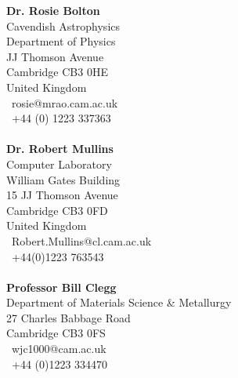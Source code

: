 \documentclass[11pt]{article}
\begin{document}
\noindent\textbf{Dr. Rosie Bolton}\\
Cavendish Astrophysics\\
Department of Physics\\
JJ Thomson Avenue\\
Cambridge CB3 0HE\\
United Kingdom\\
\Letter\ rosie@mrao.cam.ac.uk\\
\Telefon\ +44 (0) 1223 337363\\\\
\textbf{Dr. Robert Mullins}\\
Computer Laboratory\\
William Gates Building\\
15 JJ Thomson Avenue\\
Cambridge CB3 0FD\\
United Kingdom\\
\Letter\ Robert.Mullins@cl.cam.ac.uk\\
\Telefon\ +44(0)1223 763543\\\\
\textbf{Professor Bill Clegg}\\
Department of Materials Science \& Metallurgy\\
27 Charles Babbage Road\\
Cambridge CB3 0FS\\
\Letter\ wjc1000@cam.ac.uk\\
\Telefon\ +44 (0)1223 334470\\


\end{document}
